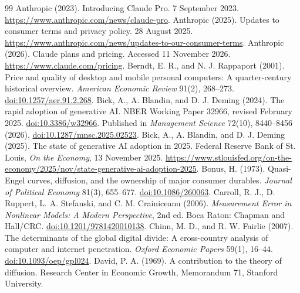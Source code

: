 \documentclass[11pt]{article}
\begin{document}
\begingroup\raggedright
\begin{thebibliography}{99}
 Anthropic (2023). Introducing Claude Pro. 7 September 2023. \url{https://www.anthropic.com/news/claude-pro}.
 Anthropic (2025). Updates to consumer terms and privacy policy. 28 August 2025. \url{https://www.anthropic.com/news/updates-to-our-consumer-terms}.
 Anthropic (2026). Claude plans and pricing. Accessed 11 November 2026. \url{https://www.claude.com/pricing}.
 Berndt, E. R., and N. J. Rappaport (2001). Price and quality of desktop and mobile personal computers: A quarter-century historical overview. \emph{American Economic Review} 91(2), 268--273. \href{https://doi.org/10.1257/aer.91.2.268}{doi:10.1257/aer.91.2.268}.
 Bick, A., A. Blandin, and D. J. Deming (2024). The rapid adoption of generative AI. NBER Working Paper 32966, revised February 2025. \href{https://doi.org/10.3386/w32966}{doi:10.3386/w32966}. Published in \emph{Management Science} 72(10), 8440--8456 (2026), \href{https://doi.org/10.1287/mnsc.2025.02523}{doi:10.1287/mnsc.2025.02523}.
 Bick, A., A. Blandin, and D. J. Deming (2025). The state of generative AI adoption in 2025. Federal Reserve Bank of St. Louis, \emph{On the Economy}, 13 November 2025. \url{https://www.stlouisfed.org/on-the-economy/2025/nov/state-generative-ai-adoption-2025}.
 Bonus, H. (1973). Quasi-Engel curves, diffusion, and the ownership of major consumer durables. \emph{Journal of Political Economy} 81(3), 655--677. \href{https://doi.org/10.1086/260063}{doi:10.1086/260063}.
 Carroll, R. J., D. Ruppert, L. A. Stefanski, and C. M. Crainiceanu (2006). \emph{Measurement Error in Nonlinear Models: A Modern Perspective}, 2nd ed. Boca Raton: Chapman and Hall/CRC. \href{https://doi.org/10.1201/9781420010138}{doi:10.1201/9781420010138}.
 Chinn, M. D., and R. W. Fairlie (2007). The determinants of the global digital divide: A cross-country analysis of computer and internet penetration. \emph{Oxford Economic Papers} 59(1), 16--44. \href{https://doi.org/10.1093/oep/gpl024}{doi:10.1093/oep/gpl024}.
 David, P. A. (1969). A contribution to the theory of diffusion. Research Center in Economic Growth, Memorandum 71, Stanford University.

\end{thebibliography}
\end{document}

